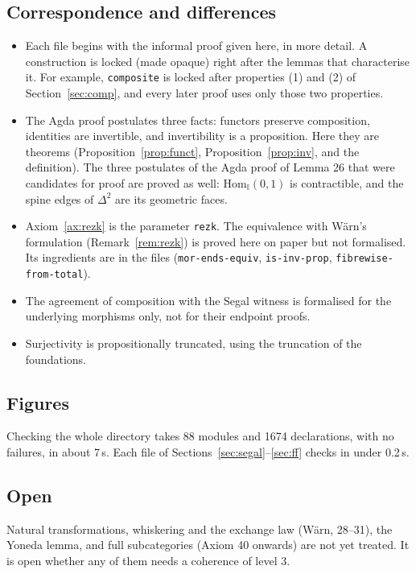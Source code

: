 \documentclass[11pt]{amsart}
\numberwithin{equation}{section}
\theoremstyle{definition}
\theoremstyle{remark}
\newcommand{\code}[1]{\texttt{#1}}
\newcommand{\Hom}{\mathrm{Hom}}
\newcommand{\II}{\mathbb{I}}
\begin{document}
\subsection{Correspondence and differences}
\begin{itemize}
\item Each file begins with the informal proof given here, in more
  detail. A construction is locked (made opaque) right after the lemmas
  that characterise it. For example, \code{composite} is locked after
  properties (1) and (2) of Section~\ref{sec:comp}, and every later
  proof uses only those two properties.
\item The Agda proof postulates three facts: functors preserve
  composition, identities are invertible, and invertibility is a
  proposition. Here they are theorems (Proposition~\ref{prop:funct},
  Proposition~\ref{prop:inv}, and the definition). The three
  postulates of the Agda proof of Lemma 26 that were candidates for
  proof are proved as well: $\Hom_\II(0,1)$ is contractible, and the
  spine edges of $\Delta^2$ are its geometric faces.
\item Axiom~\ref{ax:rezk} is the parameter \code{rezk}. The equivalence
  with W\"arn's formulation (Remark~\ref{rem:rezk}) is proved here on
  paper but not formalised. Its ingredients are in the files
  (\code{mor-ends-equiv}, \code{is-inv-prop}, \code{fibrewise-from-total}).
\item The agreement of composition with the Segal witness is formalised
  for the underlying morphisms only, not for their endpoint proofs.
\item Surjectivity is propositionally truncated, using the truncation
  of the foundations.
\end{itemize}

\subsection{Figures}
Checking the whole directory takes 88 modules and 1674 declarations,
with no failures, in about 7\,s. Each file of
Sections~\ref{sec:segal}--\ref{sec:ff} checks in under 0.2\,s.

\subsection{Open}
Natural transformations, whiskering and the exchange law (W\"arn,
28--31), the Yoneda lemma, and full subcategories (Axiom 40 onwards)
are not yet treated. It is open whether any of them needs a coherence
of level 3.
\end{document}
